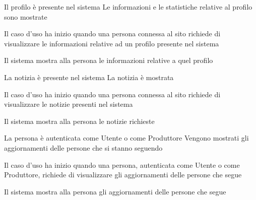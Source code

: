 \tabcuvspace

{Il profilo è presente nel sistema}
{Le informazioni e le statistiche relative al profilo sono mostrate}
{\begin{enumCU}
	\item Il caso d'uso ha inizio quando una persona connessa al sito richiede di visualizzare le informazioni relative ad un profilo presente nel sistema
	\item Il sistema mostra alla persona le informazioni relative a quel profilo
\end{enumCU}}

%

\tabcuvspace

{La notizia è presente nel sistema}
{La notizia è mostrata}
{\begin{enumCU}
	\item Il caso d'uso ha inizio quando una persona connessa al sito richiede di visualizzare le notizie presenti nel sistema
	\item Il sistema mostra alla persona le notizie richieste
\end{enumCU}}

\tabcuvspace

{La persona è autenticata come Utente o come Produttore}
{Vengono mostrati gli aggiornamenti delle persone che si stanno seguendo}
{\begin{enumCU}
	\item Il caso d'uso ha inizio quando una persona, autenticata come Utente o come Produttore, richiede di visualizzare gli aggiornamenti delle persone che segue
	\item Il sistema mostra alla persona gli aggiornamenti delle persone che segue
\end{enumCU}}



